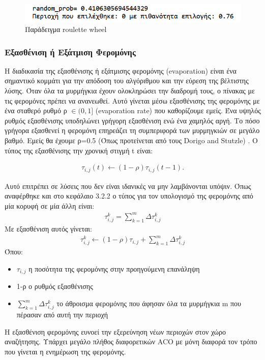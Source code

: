 \begin{figure}
    \centering
    \includegraphics[scale=0.9]{2947_thesis/pictures/roulette_wheel_example.png} 
    \caption{Παράδειγμα roulette wheel}
    \label{roulette}
\end{figure}

\subsubsection{Εξασθένιση ή Εξάτμιση Φερομόνης}

Η διαδικασία της εξασθένισης ή εξάτμισης φερομόνης (evaporation) είναι ένα σημαντικό κομμάτι για την απόδοση του αλγόριθμου και την εύρεση της βέλτιστης λύσης. Όταν όλα τα μυρμήγκια έχουν ολοκληρώσει την διαδρομή τους, ο πίνακας με τις φερομόνες πρέπει να ανανεωθεί. Αυτό γίνεται μέσω εξασθένισης της φερομόνης με ένα σταθερό ρυθμό ρ $\in (0,1]$ (evaporation rate) που καθορίζουμε εμείς. Ένα υψηλός ρυθμός εξασθένισης υποδηλώνει γρήγορη εξασθένιση ενώ ένα χαμηλός αργή. Το πόσο γρήγορα εξασθενεί η φερομόνη επηρεάζει τη συμπεριφορά των μυρμηγκιών σε μεγάλο βαθμό. \cite{dawson2013improving} Εμείς θα έχουμε ρ=0.5 (Όπως προτείνεται από τους Dorigo and Stutzle) \cite{dorigo2003ant}. Ο τύπος της εξασθένισης την χρονική στιγμή t είναι: \cite{blum2005ant} \cite{mpikou2013euretikoi}

\begin{align}
	τ_{i,j}(t)\leftarrow(1-ρ)τ_{i,j}(t-1).
\end{align}

Αυτό επιτρέπει σε λύσεις που δεν είναι ιδανικές να μην λαμβάνονται υπόψιν. Όπως αναφέρθηκε και στο κεφάλαιο 3.2.2 ο τύπος για τον υπολογισμό της φερομόνης από μία κορυφή σε μία άλλη είναι: 
\begin{align}
    τ_{i,j}^k=\sum_{k=1}^{m}{Δτ^k_{i,j}}
\end{align}
Με εξασθένιση αυτός γίνεται: 
\begin{align}
    τ_{i,j}^k\leftarrow(1-ρ)τ_{i,j}+\sum_{k=1}^{m}{Δτ^k_{i,j}}
\end{align}
Όπου: 
\begin{itemize}
    \item $τ_{i,j}$ η ποσότητα της φερομόνης στην προηγούμενη επανάληψη
    \item 1-ρ ο ρυθμός εξασθένισης
    \item $\sum_{k=1}^{m}{Δτ^k_{i,j}}$ το άθροισμα φερομόνης που άφησαν όλα τα μυρμήγκια m που πέρασαν από αυτή την περιοχή
\end{itemize}
Η εξασθένιση φερομόνης ευνοεί την εξερεύνηση νέων περιοχών στον χώρο αναζήτησης. Υπάρχει μεγάλο πλήθος διαφορετικών ACO με μόνη διαφορά τον τρόπο που γίνεται η ενημέρωση της φερομόνης. \cite{mpikou2013euretikoi}

